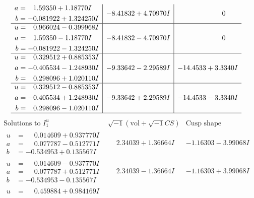 \documentclass[1p]{elsarticle_modified}
\theoremstyle{definition}
\newcommand{\I}{\sqrt{-1}}
\begin{document}
$$\begin{array}{c|c|c}
\begin{aligned}
a &= \phantom{-}1.59350 + 1.18770 I \\
b &= -0.081922 + 1.324250 I\end{aligned}
 & -8.41832 + 4.70970 I & \phantom{-0.000000 } 0 \\ \hline\begin{aligned}
u &= \phantom{-}0.966024 - 0.399968 I \\
a &= \phantom{-}1.59350 - 1.18770 I \\
b &= -0.081922 - 1.324250 I\end{aligned}
 & -8.41832 - 4.70970 I & \phantom{-0.000000 } 0 \\ \hline\begin{aligned}
u &= \phantom{-}0.329512 + 0.885353 I \\
a &= -0.405534 - 1.248930 I \\
b &= \phantom{-}0.298096 + 1.020110 I\end{aligned}
 & -9.33642 - 2.29589 I & -14.4533 + 3.3340 I \\ \hline\begin{aligned}
u &= \phantom{-}0.329512 - 0.885353 I \\
a &= -0.405534 + 1.248930 I \\
b &= \phantom{-}0.298096 - 1.020110 I\end{aligned}
 & -9.33642 + 2.29589 I & -14.4533 - 3.3340 I\\
 \hline 
 \end{array}$$\newpage$$\begin{array}{c|c|c}  
\text{Solutions to }I^u_{1}& \I (\text{vol} + \sqrt{-1}CS) & \text{Cusp shape}\\
 \hline 
\begin{aligned}
u &= \phantom{-}0.014609 + 0.937770 I \\
a &= \phantom{-}0.077787 - 0.512771 I \\
b &= -0.534953 + 0.135567 I\end{aligned}
 & \phantom{-}2.34039 + 1.36664 I & -1.16303 - 3.99068 I \\ \hline\begin{aligned}
u &= \phantom{-}0.014609 - 0.937770 I \\
a &= \phantom{-}0.077787 + 0.512771 I \\
b &= -0.534953 - 0.135567 I\end{aligned}
 & \phantom{-}2.34039 - 1.36664 I & -1.16303 + 3.99068 I \\ \hline\begin{aligned}
u &= \phantom{-}0.459884 + 0.984169 I \\

\end{aligned}
\end{array}$$
\end{document}
